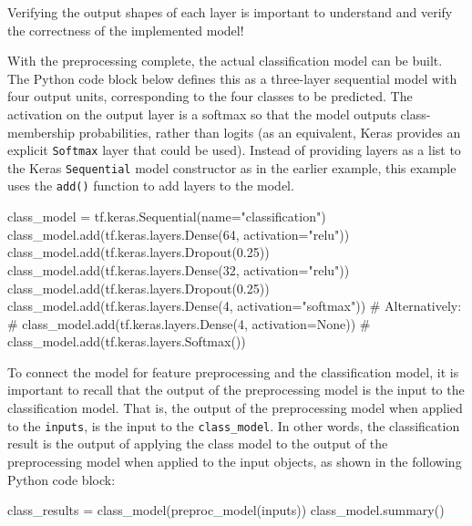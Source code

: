 \begin{tcolorbox}[colback=alert]
Verifying the output shapes of each layer is important to understand and verify the correctness of the implemented model!
\end{tcolorbox}

With the preprocessing complete, the actual classification model can be built. The Python code block below defines this as a three-layer sequential model with four output units, corresponding to the four classes to be predicted. The activation on the output layer is a softmax so that the model outputs class-membership probabilities, rather than logits (as an equivalent, Keras provides an explicit \texttt{Softmax} layer that could be used). Instead of providing layers as a list to the Keras \texttt{Sequential} model constructor as in the earlier example, this example uses the \texttt{add()} function to add layers to the model.

\begin{samepage}
\begin{pythoncode}
class_model = tf.keras.Sequential(name="classification")
class_model.add(tf.keras.layers.Dense(64, activation="relu"))
class_model.add(tf.keras.layers.Dropout(0.25))
class_model.add(tf.keras.layers.Dense(32, activation="relu"))
class_model.add(tf.keras.layers.Dropout(0.25))
class_model.add(tf.keras.layers.Dense(4, activation="softmax"))
# Alternatively:
# class_model.add(tf.keras.layers.Dense(4, activation=None))
# class_model.add(tf.keras.layers.Softmax())
\end{pythoncode}
\end{samepage}

To connect the model for feature preprocessing and the classification model, it is important to recall that the output of the preprocessing model is the input to the classification model. That is, the output of the preprocessing model when applied to the \texttt{inputs}, is the input to the \texttt{class\_model}. In other words, the classification result is the output of applying the class model to the output of the preprocessing model when applied to the input objects, as shown in the following Python code block:

\begin{samepage}
\begin{pythoncode}
class_results = class_model(preproc_model(inputs))
class_model.summary()
\end{pythoncode}
\end{samepage}

